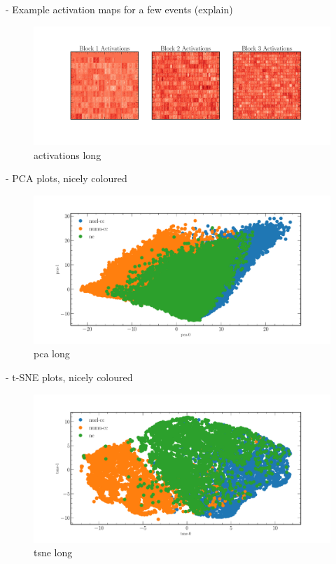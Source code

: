 - Example activation maps for a few events (explain)
\begin{figure}
    \includegraphics[width=\textwidth]{diagrams/6-cvn/chipsnet/activations.pdf}
    \caption[activations short]{activations long}
    \label{fig:activations}
\end{figure}
- PCA plots, nicely coloured
\begin{figure}
    \includegraphics[width=\textwidth]{diagrams/6-cvn/chipsnet/pca.pdf}
    \caption[pca short]{pca long}
    \label{fig:pca}
\end{figure}
- t-SNE plots, nicely coloured
\begin{figure}
    \includegraphics[width=\textwidth]{diagrams/6-cvn/chipsnet/tsne.pdf}
    \caption[tsne short]{tsne long}
    \label{fig:tsne}
\end{figure}

